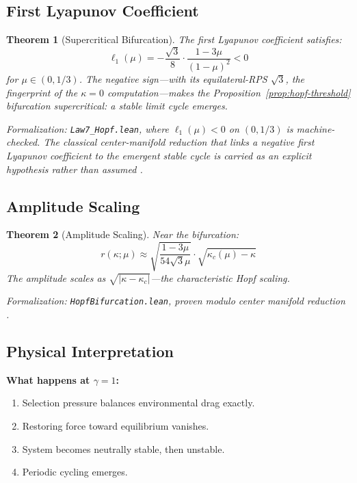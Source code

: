 \documentclass[12pt]{article}
\newtheorem{theorem}{Theorem}[section]
\begin{document}
\subsection{First Lyapunov Coefficient}

\begin{theorem}[Supercritical Bifurcation]
The first Lyapunov coefficient satisfies:
\[
\ell_1(\mu) = -\frac{\sqrt{3}}{8} \cdot \frac{1 - 3\mu}{(1 - \mu)^2} < 0
\]
for $\mu \in (0, 1/3)$. The negative sign---with its equilateral-RPS $\sqrt{3}$, the fingerprint of the $\kappa = 0$ computation---makes the Proposition~\ref{prop:hopf-threshold} bifurcation supercritical: a stable limit cycle emerges.
\end{theorem}
\noindent\textit{Formalization: \texttt{Law7\_Hopf.lean}, where $\ell_1(\mu) < 0$ on $(0, 1/3)$ is machine-checked. The classical center-manifold reduction that links a negative first Lyapunov coefficient to the emergent stable cycle is carried as an explicit hypothesis rather than assumed \citep{guckenheimer1983nonlinear}.}

\subsection{Amplitude Scaling}

\begin{theorem}[Amplitude Scaling]
Near the bifurcation:
\[
r(\kappa; \mu) \approx \sqrt{\frac{1 - 3\mu}{54\sqrt{3}\mu}} \cdot \sqrt{\kappa_c(\mu) - \kappa}
\]
The amplitude scales as $\sqrt{|\kappa - \kappa_c|}$---the characteristic Hopf scaling.
\end{theorem}
\noindent\textit{Formalization: \texttt{HopfBifurcation.lean}, proven modulo center manifold reduction \citep{guckenheimer1983nonlinear}.}

\subsection{Physical Interpretation}

\textbf{What happens at $\gamma = 1$:}
\begin{enumerate}
    \item Selection pressure balances environmental drag exactly.
    \item Restoring force toward equilibrium vanishes.
    \item System becomes neutrally stable, then unstable.
    \item Periodic cycling emerges.
\end{enumerate}
\end{document}
